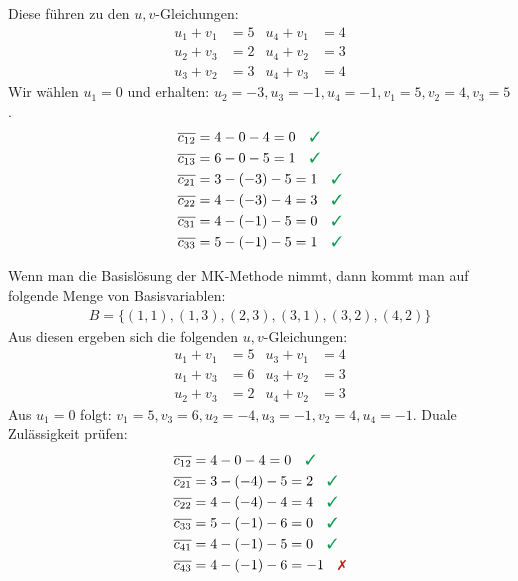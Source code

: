 \documentclass[
a4paper, %
11pt,
]
{scrartcl}
\begin{document}
\begin{enumerate}[(a)]
    Diese führen zu den $u,v$-Gleichungen:
    \begin{align*}
      u_1 + v_1 & = 5 & u_4 + v_1 & = 4\\
      u_2 + v_3 & = 2 & u_4 + v_2 & = 3\\
      u_3 + v_2 & = 3 & u_4 + v_3 & = 4
    \end{align*}
    Wir wählen $u_1 = 0$ und erhalten:
    $u_2 = -3, u_3 = -1, u_4 = -1, v_1 = 5, v_2 = 4, v_3 = 5$.
    \begin{align*}
      \overline{c_{12}} & = 4 - 0 - 4 = 0 \quad \richtig\\
      \overline{c_{13}} & = 6 - 0 - 5 = 1 \quad \richtig\\
      \overline{c_{21}} & = 3 - (-3) - 5 = 1 \quad \richtig\\
      \overline{c_{22}} & = 4 - (-3) - 4 = 3 \quad \richtig\\
      \overline{c_{31}} & = 4 - (-1) - 5 = 0 \quad \richtig\\
      \overline{c_{33}} & = 5 - (-1) - 5 = 1 \quad \richtig
    \end{align*}

    Wenn man die Basislösung der MK-Methode nimmt, dann kommt man auf folgende
    Menge von Basisvariablen:
    \begin{align*}
      B = \{(1,1), (1,3), (2,3), (3,1), (3,2), (4,2)\}
    \end{align*}
    Aus diesen ergeben sich die folgenden $u,v$-Gleichungen:
    \begin{align*}
      u_1 + v_1 & = 5 & u_3 + v_1 & = 4\\
      u_1 + v_3 & = 6 & u_3 + v_2 & = 3\\
      u_2 + v_3 & = 2 & u_4 + v_2 & = 3
    \end{align*}
    Aus $u_1 = 0$ folgt:
    $v_1 = 5, v_3 = 6, u_2 = -4, u_3 = -1, v_2 = 4, u_4 = -1$.
    Duale Zulässigkeit prüfen:
    \begin{align*}
      \overline{c_{12}} & = 4 - 0 - 4 = 0 \quad \richtig\\
      \overline{c_{21}} & = 3 - (-4) - 5 = 2 \quad \richtig\\
      \overline{c_{22}} & = 4 - (-4) - 4 = 4 \quad \richtig\\
      \overline{c_{33}} & = 5 - (-1) - 6 = 0 \quad \richtig\\
      \overline{c_{41}} & = 4 - (-1) - 5 = 0 \quad \richtig\\
      \overline{c_{43}} & = 4 - (-1) - 6 = -1 \quad \falsch
    \end{align*}


\end{enumerate}
\end{document}
